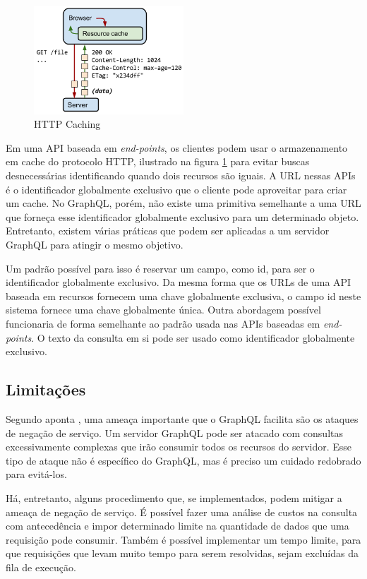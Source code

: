 \begin{figure}[htbp]
\centering
\includegraphics[width=0.5\textwidth]{figuras/cache-http.png}
\caption{HTTP Caching}
\label{fig:cache-http}
\end{figure}

Em uma API baseada em \textit{end-points}, os clientes podem usar o armazenamento em cache do protocolo HTTP, ilustrado na figura \ref{fig:cache-http} para evitar buscas desnecessárias identificando quando dois recursos são iguais. A URL nessas APIs é o identificador globalmente exclusivo que o cliente pode aproveitar para criar um cache. No GraphQL, porém, não existe uma primitiva semelhante a uma URL que forneça esse identificador globalmente exclusivo para um determinado objeto. Entretanto, existem várias práticas que podem ser aplicadas a um servidor GraphQL para atingir o mesmo objetivo.

Um padrão possível para isso é reservar um campo, como \textup{id}, para ser o identificador globalmente exclusivo. Da mesma forma que os URLs de uma API baseada em recursos fornecem uma chave globalmente exclusiva, o campo \textup{id} neste sistema fornece uma chave globalmente única. Outra abordagem possível funcionaria de forma semelhante ao padrão usada nas APIs baseadas em \textit{end-points}. O texto da consulta em si pode ser usado como identificador globalmente exclusivo. 

\subsection{Limitações}

Segundo aponta , uma ameaça importante que o GraphQL facilita são os ataques de negação de serviço. Um servidor GraphQL pode ser atacado com consultas excessivamente complexas que irão consumir todos os recursos do servidor. Esse tipo de ataque não é específico do GraphQL, mas é preciso um cuidado redobrado para evitá-los.

Há, entretanto, alguns procedimento que, se implementados, podem mitigar a ameaça de negação de serviço. É possível fazer uma análise de custos na consulta com antecedência e impor determinado limite na quantidade de dados que uma requisição pode consumir. Também é possível implementar um tempo limite, para que requisições que levam muito tempo para serem resolvidas, sejam excluídas da fila de execução.